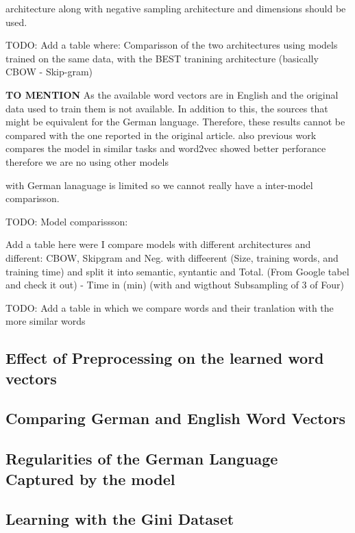 architecture along with negative sampling 
architecture and dimensions should be used. 

TODO:  Add a table where: 
Comparisson of the two architectures using models trained on the same data,
with the BEST  tranining architecture (basically CBOW - Skip-gram)

\textbf{TO MENTION}
As the available word vectors are in English and the original data used  to train
them is not available.  In addition to this, the sources that might be
equivalent for the German language.  Therefore, these results cannot be
compared with the one reported in the original article. also previous work
compares the model in similar tasks and word2vec showed better perforance
therefore we are no using other models 

with German lanaguage is limited so we cannot really have a inter-model
comparisson.


TODO: Model comparissson:

Add a table here were I compare models with different architectures and
different: CBOW, Skipgram and Neg. with diffeerent (Size, training words, and
training time) and split it into semantic, syntantic and Total. (From Google
tabel and check it out) - Time in (min) (with and wigthout Subsampling of 3
of Four)



TODO: Add a table in which we compare words and their tranlation with the
more similar words 

\subsection{Effect of Preprocessing on the learned word vectors}


\subsection{Comparing German and English Word Vectors}


\subsection{Regularities of the German Language Captured by the model}
\label{sec:sub:particularities_of_the_German_language}

\subsection{Learning with the Gini Dataset}
\label{sec:learning_with_the_gini_dataset}


